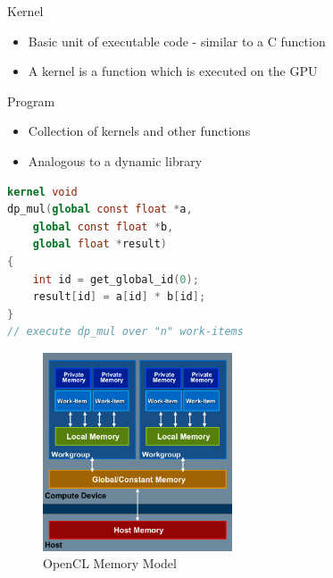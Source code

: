 Kernel

\begin{itemize}
\tightlist
\item
  Basic unit of executable code - similar to a C function
\item
  A kernel is a function which is executed on the GPU
\end{itemize}

Program

\begin{itemize}
\tightlist
\item
  Collection of kernels and other functions
\item
  Analogous to a dynamic library
\end{itemize}

\begin{lstlisting}[language=OpenCL]
kernel void
dp_mul(global const float *a,
    global const float *b,
    global float *result)
{
    int id = get_global_id(0);
    result[id] = a[id] * b[id];
}
// execute dp_mul over "n" work-items
\end{lstlisting}

\begin{figure}[H]
\centering
\includegraphics[width=0.5\textwidth]{figures/openClMemoryScheme.png}
\caption{OpenCL Memory Model}
\end{figure}

